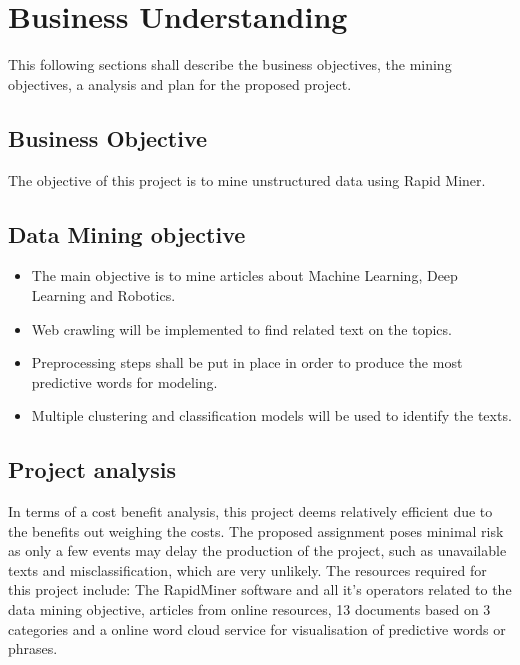 
\section*{Business Understanding}

This following sections shall describe the business objectives, the mining objectives, a analysis and plan for the proposed project.

\subsection*{Business Objective}
The objective of this project is to mine unstructured data using Rapid Miner.

\subsection*{Data Mining objective}
\begin{itemize}
	\item The main objective is to mine articles about Machine Learning, Deep Learning and Robotics. 
	\item Web crawling will be implemented to find related text on the topics.
	\item Preprocessing steps shall be put in place in order to produce the most predictive words for modeling.
	\item Multiple clustering and classification models will be used to identify the texts.
\end{itemize}

\subsection*{Project analysis}
In terms of a cost benefit analysis, this project deems relatively efficient due to the benefits out weighing the costs. The proposed assignment poses minimal risk as only a few events may delay the production of the project, such as unavailable texts and misclassification, which are very unlikely. The resources required for this project include: The RapidMiner software and all it's operators related to the data mining objective, articles from online resources, 13 documents based on 3 categories and a online word cloud service for visualisation of predictive words or phrases. 

 
